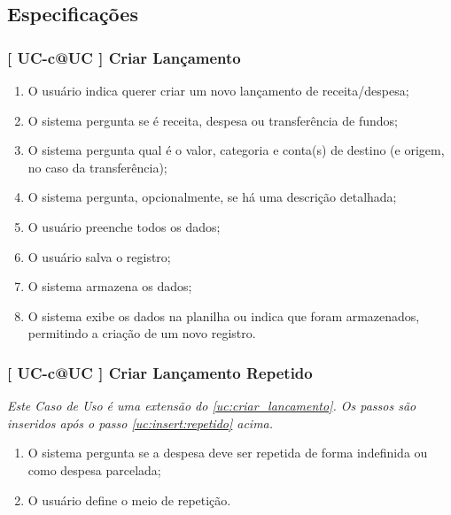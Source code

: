 \documentclass[a4paper]{abnt}
\begin{document}
\subsection{Especificações}
\newcommand\pad[1] {\expandafter\realpad\csname c@#1\endcsname}
\newcommand\realpad[1] {%
	\ifnum #1<10 0\fi%
	\number#1%
}
\renewcommand{\theUC} {UC-\pad{UC}}
\DeclareRobustCommand{\UC} {%
	\theUC%
}

\subsubsection{[\UC\label{uc:criar_lancamento}] Criar Lançamento}
\begin{enumerate}[itemsep=-1ex]
	\item O usuário indica querer criar um novo lançamento de receita/despesa;
	\item O sistema pergunta se é receita, despesa ou transferência de fundos;
	\item O sistema pergunta qual é o valor, categoria e conta(s) de destino (e origem, no caso da transferência);
	\item \label{uc:insert:repetido} O sistema pergunta, opcionalmente, se há uma descrição detalhada;
	\item O usuário preenche todos os dados;
	\item O usuário salva o registro;
	\item O sistema armazena os dados;
	\item O sistema exibe os dados na planilha ou indica que foram armazenados, permitindo a criação de um novo registro.
\end{enumerate}

\subsubsection{[\UC] Criar Lançamento Repetido}
\emph{Este Caso de Uso é uma extensão do \ref{uc:criar_lancamento}. Os passos s\~ao inseridos após o passo \ref{uc:insert:repetido} acima.}
\begin{enumerate}[itemsep=-1ex,topsep=-1ex]
	\item O sistema pergunta se a despesa deve ser repetida de forma indefinida ou como despesa parcelada;
	\item O usuário define o meio de repetição.
\end{enumerate}
\end{document}
